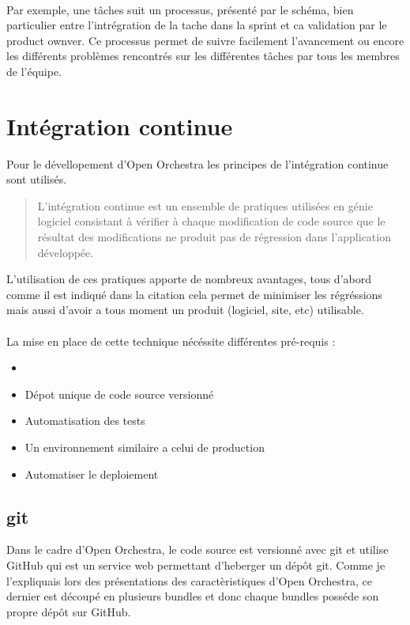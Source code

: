 \paragraph{}
Par exemple, une tâches suit un processus, présenté par le schéma, bien particulier entre l'intrégration de la tache dans la sprint et ca validation par le product ownver. Ce processus permet de suivre facilement l'avancement ou encore les différents problèmes rencontrés sur les différentes tâches par tous les membres de l'équipe.
\section{Intégration continue}
Pour le dévellopement d'Open Orchestra les principes de l'intégration continue sont utilisés. 
\begin{quotation}
L'intégration continue est un ensemble de pratiques utilisées en génie logiciel consistant à vérifier à chaque modification de code source que le résultat des modifications ne produit pas de régression dans l'application développée.
\end{quotation}
L'utilisation de ces pratiques apporte de nombreux avantages, tous d'abord comme il est indiqué dans la citation cela permet de minimiser les régréssions mais aussi d'avoir a tous moment un produit (logiciel, site, etc) utilisable.
\paragraph{}
La mise en place de cette technique nécéssite différentes pré-requis : 
\begin{itemize}
\item[]
\item Dépot unique de code source versionné
\item Automatisation des tests
\item Un environnement similaire a celui de production
\item Automatiser le deploiement
\end{itemize}

\subsection{git}
Dans le cadre d'Open Orchestra, le code source est versionné avec git et utilise GitHub qui est un service web permettant d'heberger un dépôt git. Comme je l'expliquais lors des présentations des caractèristiques d'Open Orchestra, ce dernier est découpé en plusieurs bundles et donc chaque bundles posséde son propre dépôt sur GitHub.
